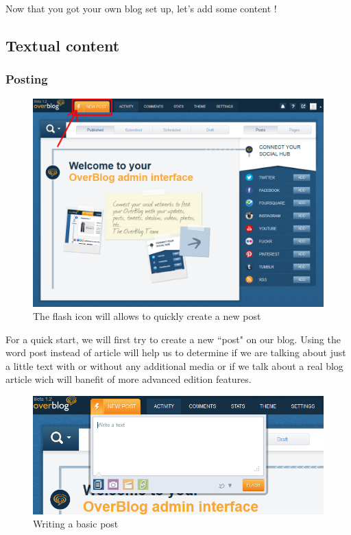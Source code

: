 \documentclass[a4paper,10pt]{article}
\begin{document}
Now that you got your own blog set up, let's add some content ! 

\subsection{Textual content}

\subsubsection{Posting}

\begin{figure}[H]
    \center
	\includegraphics[width=13cm]{Images/strike001.png}
    \caption{The flash icon will allows to quickly create a new post}
\end{figure}

For a quick start, we will first try to create a new ``post" on our blog. Using the word post instead of article will help us to determine if we are talking about just a little text with or without any additional media or if we talk about a real blog article wich will banefit of more advanced edition features. 

\begin{figure}[H]
    \center
	\includegraphics[width=13cm]{Images/flash001.png}
    \caption{Writing a basic post}
\end{figure}
\end{document}
